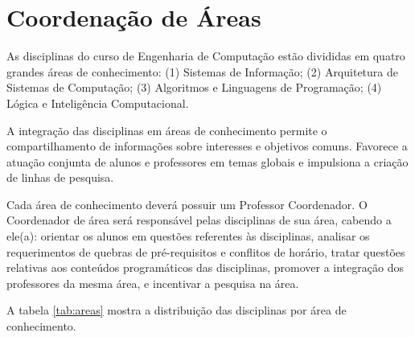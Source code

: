 
\section{Coordenação de Áreas}

As disciplinas do curso de Engenharia de Computação estão divididas em quatro grandes áreas de conhecimento: (1) Sistemas de Informação; (2) Arquitetura de Sistemas de Computação; (3) Algoritmos e Linguagens de Programação; (4) Lógica e Inteligência Computacional.

A integração das disciplinas em áreas de conhecimento permite o compartilhamento de informações sobre interesses e objetivos comuns. Favorece a atuação conjunta de alunos e professores em temas globais e impulsiona a criação de linhas de pesquisa. 

Cada área de conhecimento deverá possuir um Professor Coordenador. O Coordenador de área será responsável pelas disciplinas de sua área, cabendo a ele(a): orientar os alunos em questões referentes às disciplinas, analisar os requerimentos de quebras de pré-requisitos e conflitos de horário, tratar questões relativas aos conteúdos programáticos das disciplinas, promover a integração dos professores da mesma área, e  incentivar a pesquisa na área.

A tabela \ref{tab:areas} mostra a distribuição das disciplinas por área de conhecimento.

